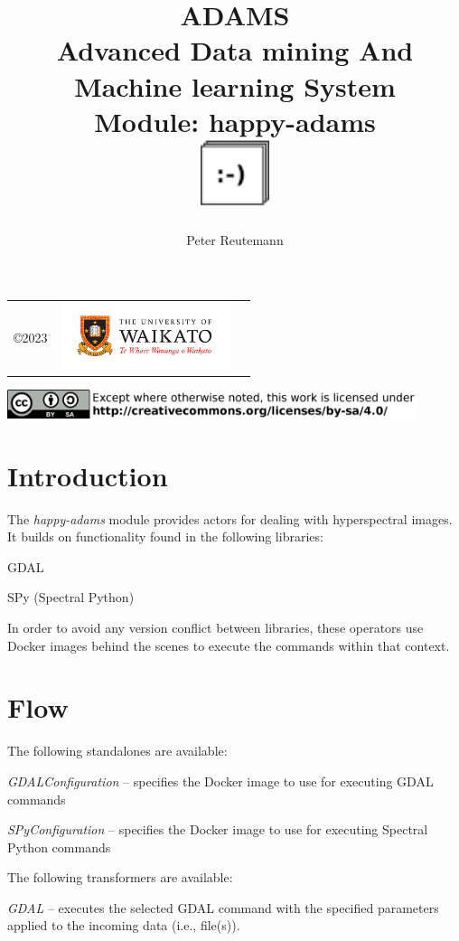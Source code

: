 \documentclass[a4paper]{book}
\title{
  \textbf{ADAMS} \\
  {\Large \textbf{A}dvanced \textbf{D}ata mining \textbf{A}nd \textbf{M}achine
  learning \textbf{S}ystem} \\
  {\Large Module: happy-adams} \\
  \vspace{1cm}
  \includegraphics[width=2cm]{images/happy-adams-module.png} \\
}
\author{
  Peter Reutemann
}
\begin{document}
\begin{titlepage}
\maketitle

\thispagestyle{empty}
\center
\begin{table}[b]
	\begin{tabular}{c l l}
		\parbox[c][2cm]{2cm}{\copyright 2023} &
		\parbox[c][2cm]{5cm}{\includegraphics[width=5cm]{images/coat_of_arms.pdf}} \\
	\end{tabular}
	\includegraphics[width=12cm]{images/cc.png} \\
\end{table}

\end{titlepage}

\tableofcontents

\chapter{Introduction}
The \textit{happy-adams} module provides actors for dealing with hyperspectral images.
It builds on functionality found in the following libraries:

\begin{tight_itemize}
  \item GDAL\cite{gdal}
  \item SPy (Spectral Python)\cite{spy}
\end{tight_itemize}

In order to avoid any version conflict between libraries, these operators use Docker\cite{docker}
images behind the scenes to execute the commands within that context.

\chapter{Flow}
The following standalones are available:
\begin{tight_itemize}
  \item \textit{GDALConfiguration} -- specifies the Docker image to use for executing GDAL commands
  \item \textit{SPyConfiguration} -- specifies the Docker image to use for executing Spectral Python commands
\end{tight_itemize}
The following transformers are available:
\begin{tight_itemize}
  \item \textit{GDAL} -- executes the selected GDAL command with the specified parameters applied to the incoming data (i.e., file(s)).
\end{tight_itemize}
\end{document}
